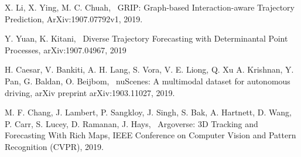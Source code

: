 \documentclass[a4paper, 10pt, conference]{ieeeconf}      %
\begin{document}
\begin{thebibliography}{99}
 X. Li, X. Ying, M. C. Chuah, ~GRIP: Graph-based Interaction-aware Trajectory Prediction,
ArXiv:1907.07792v1, 2019.

 Y. Yuan, K. Kitani, ~Diverse Trajectory Forecasting with Determinantal Point Processes,
arXiv:1907.04967, 2019

 H. Caesar, V. Bankiti, A. H. Lang, S. Vora,
          V. E. Liong, Q. Xu A. Krishnan, Y. Pan,
          G. Baldan, O. Beijbom, ~nuScenes: A multimodal dataset for autonomous driving,
        arXiv preprint arXiv:1903.11027, 2019.

 M. F. Chang, J. Lambert, P. Sangkloy, J. Singh, S. Bak, A. Hartnett, D. Wang, P. Carr, S. Lucey, D. Ramanan, J. Hays,
~Argoverse: 3D Tracking and Forecasting With Rich Maps,
IEEE Conference on Computer Vision and Pattern Recognition (CVPR), 2019.











\end{thebibliography}
\end{document}
